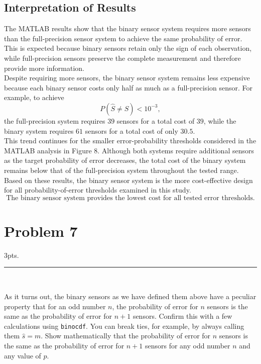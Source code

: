 \documentclass[12pt,a4paper]{article}
\begin{document}
\subsection{Interpretation of Results}

The MATLAB results show that the binary sensor system requires more sensors than the full-precision sensor system to achieve the same probability of error. This is expected because binary sensors retain only the sign of each observation, while full-precision sensors preserve the complete measurement and therefore provide more information.\\

Despite requiring more sensors, the binary sensor system remains less expensive because each binary sensor costs only half as much as a full-precision sensor. For example, to achieve
\[
P(\hat{S}\neq S)<10^{-3},
\]
the full-precision system requires \(39\) sensors for a total cost of \(39\), while the binary system requires \(61\) sensors for a total cost of only \(30.5\).\\

This trend continues for the smaller error-probability thresholds considered in the MATLAB analysis in Figure 8. Although both systems require additional sensors as the target probability of error decreases, the total cost of the binary system remains below that of the full-precision system throughout the tested range.\\

Based on these results, the binary sensor system is the more cost-effective design for all probability-of-error thresholds examined in this study.
\[
\boxed{\text{The binary sensor system provides the lowest cost for all tested error thresholds.}}
\]

\clearpage

\section{Problem 7}
3pts.\\

\hrule 

\

\noindent As it turns out, the binary sensors as we have defined them above have a peculiar property that for an odd number $n$, the probability of error for $n$ sensors is the same as the probability of error for $n+1$ sensors. Confirm this with a few calculations using \texttt{binocdf}. You can break ties, for example, by always calling them $\hat{s} = m$. Show mathematically that the probability of error for $n$ sensors is the same as the probability of error for $n+1$ sensors for any odd number $n$ and any value of $p$.
\\
\end{document}
